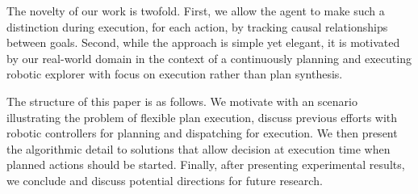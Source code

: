 The novelty of our work is twofold. First, we allow the agent to make
such a distinction during execution, for each action, by tracking
causal relationships between goals. Second, while the approach is
simple yet elegant, it is motivated by our real-world domain in the
context of a continuously planning and executing robotic explorer with
focus on execution rather than plan synthesis.


The structure of this paper is as follows. We motivate with an
scenario illustrating the problem of flexible plan execution, discuss
previous efforts with robotic controllers for planning and dispatching
for execution. We then present the algorithmic detail to solutions
that allow decision at execution time when planned actions should be
started. Finally, after presenting experimental results, we conclude
and discuss potential directions for future research.

